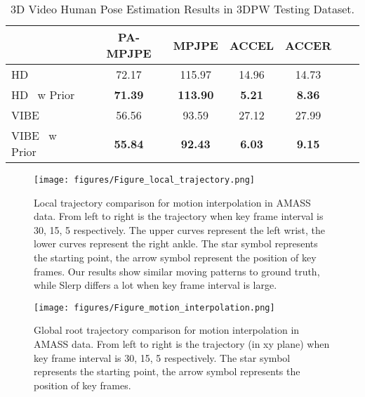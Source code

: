\begin{table}[t!]
\small
\begin{center}
\footnotesize{
\setlength{\tabcolsep}{5pt}
\begin{tabular}{@{}l||cccccc@{}} 
\hline
 & PA-MPJPE  & MPJPE & ACCEL& ACCER \\ \hline\hline
HD~\cite{kanazawa2019learning} & 72.17 & 115.97 & 14.96 & 14.73 \\ \hline
HD~\cite{kanazawa2019learning} w Prior & \textbf{71.39} & \textbf{113.90} & \textbf{5.21} & \textbf{8.36} \\ \hline
VIBE~\cite{kocabas2020vibe} & 56.56 & 93.59 & 27.12 & 27.99  \\ \hline
VIBE~\cite{kocabas2020vibe} w Prior & \textbf{55.84} & \textbf{92.43} & \textbf{6.03} & \textbf{9.15}  \\ \hline
\end{tabular}
}
\end{center}
\vspace{-4mm}
\caption{\small 3D Video Human Pose Estimation Results in 3DPW Testing Dataset. }
\label{table:pose-estimate-res}
\vspace{-4mm}
\end{table}




\begin{figure*}[h]
\begin{center}   \texttt{[image: figures/Figure\_local\_trajectory.png]}
\end{center}
\vspace{-4mm}
\caption{Local trajectory comparison for motion interpolation in AMASS data. From left to right is the trajectory when key frame interval is 30, 15, 5 respectively. The upper curves represent the left wrist, the lower curves represent the right ankle. The star symbol represents the starting point, the arrow symbol represent the position of key frames. Our results show similar moving patterns to ground truth, while Slerp differs a lot when key frame interval is large. }
\label{motion_interp_local_trajectory}
\end{figure*}

\begin{figure*}[h]
\begin{center}
\texttt{[image: figures/Figure\_motion\_interpolation.png]}
\end{center}
\vspace{-4mm}
\caption{Global root trajectory comparison for motion interpolation in AMASS data. From left to right is the trajectory (in xy plane) when key frame interval is 30, 15, 5 respectively. The star symbol represents the starting point, the arrow symbol represents the position of key frames. 
}
\label{motion_interp_global_trajectory}
\vspace{-1mm}
\end{figure*}

